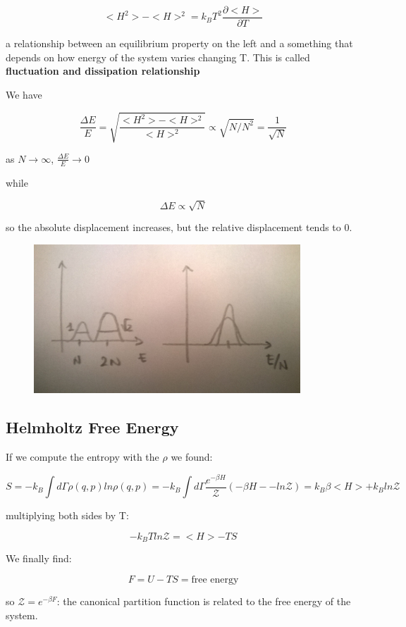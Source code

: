 \documentclass[a4paper, italian, openany]{book}
\begin{document}
$$<H^2> - <H>^2 = k_B T^2 \frac{\partial <H>}{\partial T}$$

a relationship between an equilibrium property on the left and a something that depends on how energy of the system varies changing T. This is called \textbf{fluctuation and dissipation relationship}

We have

$$\frac{\Delta E}{E} = \sqrt{\frac{<H^2> -<H>^2}{<H>^2}} \propto \sqrt{N/N^2} = \frac{1}{\sqrt{N}}$$

as $N \to \infty$, $\frac{\Delta E}{E} \to 0$

while

$$\Delta E \propto \sqrt{N}$$

so the absolute displacement increases, but the relative displacement tends to 0.

\begin{figure}[H]
\centering
\includegraphics[width=100mm]{img/figure9.jpg}
\end{figure}

\subsection{Helmholtz Free Energy}

If we compute the entropy with the $\rho$ we found:

$$S = -k_B \int d\Gamma \rho(q, p) ln \rho(q, p) = -k_B \int d\Gamma \frac{e^{-\beta H}}{\mathcal{Z}} (-\beta H --ln \mathcal{Z}) = k_B \beta <H> + k_B ln \mathcal{Z}$$

multiplying both sides by T:

$$- k_B T ln \mathcal{Z} = <H> - TS$$

We finally find:

$$F = U - TS = \mbox{free energy}$$

so $\mathcal{Z} = e^{-\beta F}$: the canonical partition function is related to the free energy of the system.
\end{document}

